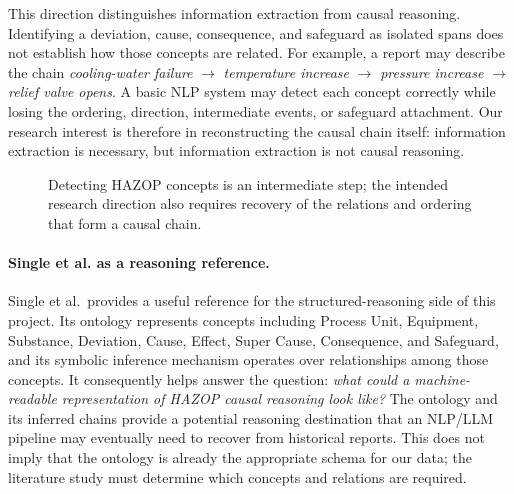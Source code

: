 This direction distinguishes information extraction from causal reasoning.
Identifying a deviation, cause, consequence, and safeguard as isolated spans
does not establish how those concepts are related. For example, a report may
describe the chain
\emph{cooling-water failure} $\rightarrow$ \emph{temperature increase}
$\rightarrow$ \emph{pressure increase} $\rightarrow$ \emph{relief valve
opens}. A basic NLP system may detect each concept correctly while losing the
ordering, direction, intermediate events, or safeguard attachment. Our
research interest is therefore in reconstructing the causal chain itself:
information extraction is necessary, but information extraction is not causal
reasoning.

\begin{figure}[htbp]
\centering
{}%
\caption[Information extraction versus causal reasoning]{Detecting HAZOP
concepts is an intermediate step; the intended research direction also
requires recovery of the relations and ordering that form a causal chain.}
\label{fig:w2-extraction-vs-reasoning}
\end{figure}

\paragraph{Single et al. as a reasoning reference.}
Single et al.\ provides a useful reference for the structured-reasoning side
of this project. Its ontology represents concepts including Process Unit,
Equipment, Substance, Deviation, Cause, Effect, Super Cause, Consequence, and
Safeguard, and its symbolic inference mechanism operates over relationships
among those concepts. It consequently helps answer the question: \emph{what
could a machine-readable representation of HAZOP causal reasoning look like?}
The ontology and its inferred chains provide a potential reasoning destination
that an NLP/LLM pipeline may eventually need to recover from historical
reports. This does not imply that the ontology is already the appropriate
schema for our data; the literature study must determine which concepts and
relations are required.

